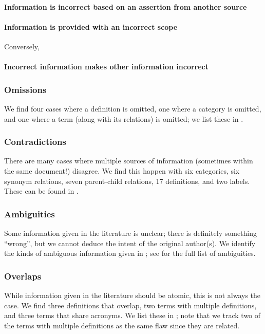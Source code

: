 \paragraph{Information is incorrect based on an assertion from another source}
\errorGuessFlaw{}

\paragraph{Information is provided with an incorrect scope}
\parSheetTestFlaw{} Conversely, \tolTestFlaw*{}

\paragraph{Incorrect information makes other information incorrect}
\redBoxFlaw{}

\subsubsection{Omissions}\label{miss}
We find four cases where a definition is omitted, one where a category is
omitted, and one where a term (along with its relations) is omitted\ifnotpaper;
we list these in \fi.

\subsubsection{Contradictions}\label{contra}
There are many cases where multiple sources of information (sometimes within
the same document!) disagree. We find this happen with six categories, six
synonym relations, seven parent-child relations, 17 definitions, and two
labels. \ifnotpaper These can be found in .\fi

\subsubsection{Ambiguities}\label{ambi}
Some information given in the literature is unclear; there is definitely
something ``wrong'', but we cannot deduce the intent of the original author(s).
We identify the kinds of ambiguous information given in %
\ifnotpaper; see  for the full list of ambiguities\fi.



\subsubsection{Overlaps}\label{over}
While information given in the literature should be atomic, this is not
always the case. We find three definitions that overlap, two terms with
multiple definitions, and three terms that share acronyms. \ifnotpaper We list
    these in ; note that we track two of the terms with
    multiple definitions as the same flaw since they are related. \fi

